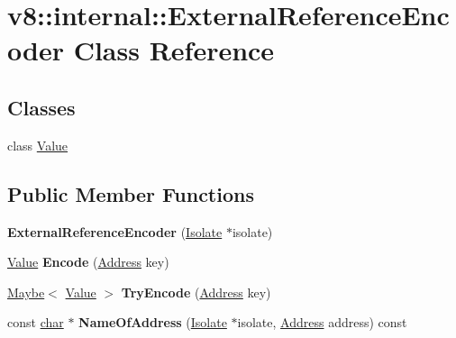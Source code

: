 \hypertarget{classv8_1_1internal_1_1ExternalReferenceEncoder}{}\section{v8\+:\+:internal\+:\+:External\+Reference\+Encoder Class Reference}
\label{classv8_1_1internal_1_1ExternalReferenceEncoder}
\subsection*{Classes}
\begin{DoxyCompactItemize}
\item 
class \mbox{\hyperlink{classv8_1_1internal_1_1ExternalReferenceEncoder_1_1Value}{Value}}
\end{DoxyCompactItemize}
\subsection*{Public Member Functions}
\begin{DoxyCompactItemize}
\item 
\mbox{\label{classv8_1_1internal_1_1ExternalReferenceEncoder_a6a214ce4f5b34106c1147943237aee2e}} 
{\bfseries External\+Reference\+Encoder} (\mbox{\hyperlink{classv8_1_1internal_1_1Isolate}{Isolate}} $\ast$isolate)
\item 
\mbox{\label{classv8_1_1internal_1_1ExternalReferenceEncoder_a4f2a73bebcf79d8c8d8ff7627e6e5c77}} 
\mbox{\hyperlink{classv8_1_1internal_1_1ExternalReferenceEncoder_1_1Value}{Value}} {\bfseries Encode} (\mbox{\hyperlink{classuintptr__t}{Address}} key)
\item 
\mbox{\label{classv8_1_1internal_1_1ExternalReferenceEncoder_a9f70a64b08c8760cf2f2adbe15e6278c}} 
\mbox{\hyperlink{classv8_1_1Maybe}{Maybe}}$<$ \mbox{\hyperlink{classv8_1_1internal_1_1ExternalReferenceEncoder_1_1Value}{Value}} $>$ {\bfseries Try\+Encode} (\mbox{\hyperlink{classuintptr__t}{Address}} key)
\item 
\mbox{\label{classv8_1_1internal_1_1ExternalReferenceEncoder_af43b51c17308404af2c5ae6c65d067a7}} 
const \mbox{\hyperlink{classchar}{char}} $\ast$ {\bfseries Name\+Of\+Address} (\mbox{\hyperlink{classv8_1_1internal_1_1Isolate}{Isolate}} $\ast$isolate, \mbox{\hyperlink{classuintptr__t}{Address}} address) const
\end{DoxyCompactItemize}


